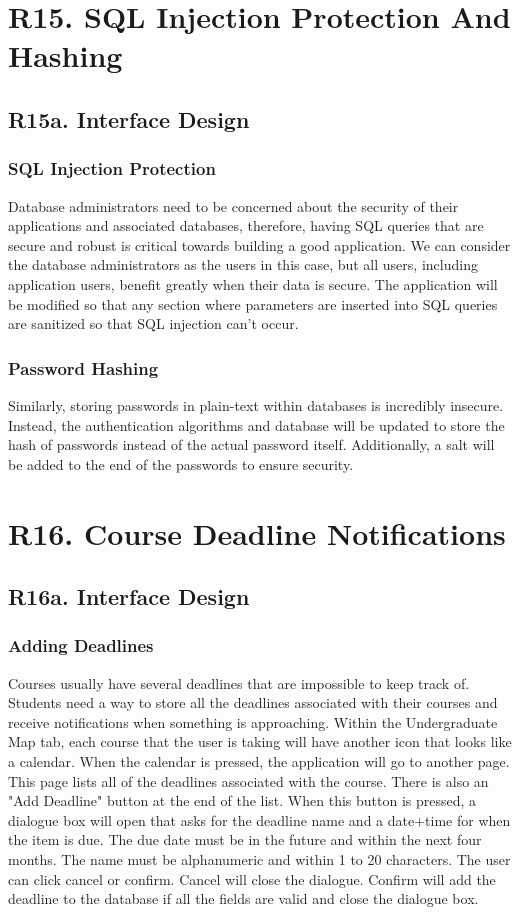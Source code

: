 \documentclass[12pt, a4paper]{article}
\begin{document}
\section*{R15. SQL Injection Protection And Hashing}
\label{sec:R15}
\subsection*{R15a. Interface Design}
\subsubsection*{SQL Injection Protection}
Database administrators need to be concerned about the security of their applications and associated databases, therefore, having SQL queries that are secure and robust is critical towards building a good application. We can consider the database administrators as the users in this case, but all users, including application users, benefit greatly when their data is secure. The application will be modified so that any section where parameters are inserted into SQL queries are sanitized so that SQL injection can't occur.
\subsubsection*{Password Hashing}
Similarly, storing passwords in plain-text within databases is incredibly insecure. Instead, the authentication algorithms and database will be updated to store the hash of passwords instead of the actual password itself. Additionally, a salt will be added to the end of the passwords to ensure security. 
\section*{R16. Course Deadline Notifications}
\label{sec:R16}
\subsection*{R16a. Interface Design}
\subsubsection*{Adding Deadlines}
Courses usually have several deadlines that are impossible to keep track of. Students need a way to store all the deadlines associated with their courses and receive notifications when something is approaching. Within the Undergraduate Map tab, each course that the user is taking will have another icon that looks like a calendar. When the calendar is pressed, the application will go to another page. This page lists all of the deadlines associated with the course. There is also an "Add Deadline" button at the end of the list. When this button is pressed, a dialogue box will open that asks for the deadline name and a date+time for when the item is due. The due date must be in the future and within the next four months. The name must be alphanumeric and within 1 to 20 characters. The user can click cancel or confirm. Cancel will close the dialogue. Confirm will add the deadline to the database if all the fields are valid and close the dialogue box. 
\end{document}
